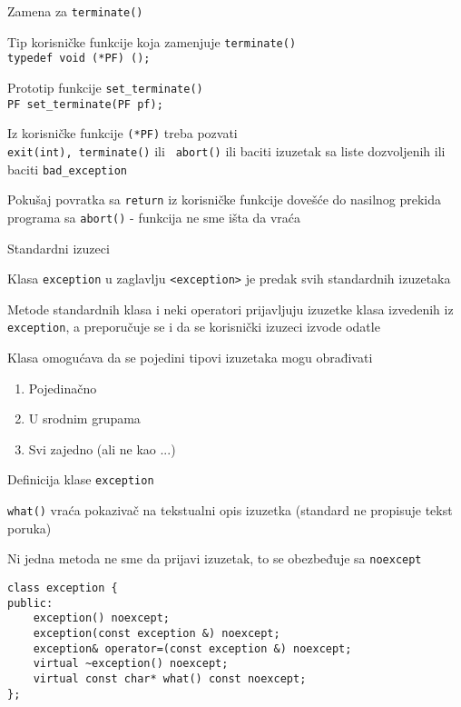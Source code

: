 \documentclass{article}
\newenvironment{xitemize}{%
    
    \itemize
    \larger
}{%
    \enditemize
}
\let\olditemize\itemize
\let\endolditemize\enditemize
\renewenvironment{itemize}{%
    \smaller
    \olditemize
}{%
    \endolditemize
}
\providecommand{\inlinecode}[1]{\texttt{#1}}
\begin{document}
\begin{xitemize}
\item Zamena za \inlinecode{terminate()}
\begin{itemize}
    \item Tip korisničke funkcije koja zamenjuje  \inlinecode{terminate()}\\
    \inlinecode{typedef void (*PF) ();}
    \item Prototip funkcije \inlinecode{set\_terminate()}\\
    \inlinecode{PF set\_terminate(PF pf);}
    \item Iz korisničke funkcije \inlinecode{(*PF)} treba pozvati \\
    \inlinecode{exit(int), terminate()} ili \inlinecode{ abort()} ili baciti izuzetak sa liste dozvoljenih ili baciti \inlinecode{bad\_exception}
    \item Pokušaj povratka sa \inlinecode{return} iz korisničke funkcije dovešće do nasilnog prekida programa sa \inlinecode{abort()} - funkcija ne sme išta da vraća
\end{itemize}
\item Standardni izuzeci
\begin{itemize}
    \item Klasa \inlinecode{exception} u zaglavlju \inlinecode{<exception>} je predak svih standardnih izuzetaka
    \item Metode standardnih klasa i neki operatori prijavljuju izuzetke klasa izvedenih iz \inlinecode{exception}, a preporučuje se i da se korisnički izuzeci izvode odatle
    \item Klasa omogućava da se pojedini tipovi izuzetaka mogu obrađivati
    \begin{enumerate}
        \item Pojedinačno
        \item U srodnim grupama
        \item Svi zajedno (ali ne kao ...)
    \end{enumerate}
\end{itemize}
\item Definicija klase \inlinecode{exception}
\begin{itemize}
    \item \inlinecode{what()} vraća pokazivač na tekstualni opis izuzetka (standard ne propisuje tekst poruka)
    \item Ni jedna metoda ne sme da prijavi izuzetak, to se obezbeđuje sa \inlinecode{noexcept}
\begin{lstlisting}
class exception {
public:
    exception() noexcept;
    exception(const exception &) noexcept;
    exception& operator=(const exception &) noexcept;
    virtual ~exception() noexcept;
    virtual const char* what() const noexcept;
};
\end{lstlisting}
\end{itemize}

\end{xitemize}
\end{document}
